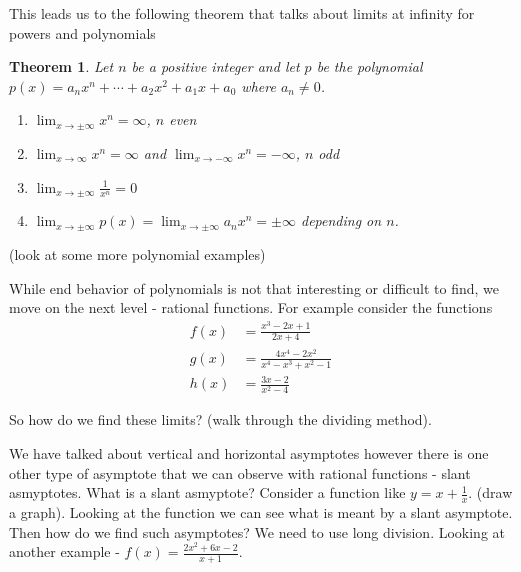 \documentclass[12pt,reqno]{article}
\newtheorem{Theorem}{Theorem}
\theoremstyle{definition}
\begin{document}
This leads us to the following theorem that talks about limits at infinity for powers and polynomials
\begin{Theorem}
	Let $n$ be a positive integer and let $p$ be the polynomial $p(x) = a_n x^n + \cdots + a_2 x^2 + a_1 x + a_0$ where $a_n \neq 0$. 
	\begin{enumerate}
		\item[a.] $\lim_{x\to\pm \infty} x^n = \infty$, $n$ even 
		\item[b.] $\lim_{x\to\infty} x^n = \infty$ and $\lim_{x\to-\infty} x^n = -\infty$, $n$ odd 
		\item[c.] $\lim_{x\to\pm \infty} \frac{1}{x^n} = 0$ 
		\item[d.] $\lim_{x \to \pm \infty} p(x) = \lim_{x \to \pm \infty} a_n x^n = \pm \infty$ depending on $n$. 
	\end{enumerate}
\end{Theorem}

(look at some more polynomial examples)

While end behavior of polynomials is not that interesting or difficult to find, we move on the next level - rational functions. For example consider the functions 
\begin{align*}
	f(x) &= \frac{x^3 - 2x + 1}{2x + 4} \\
	g(x) &= \frac{4 x^4 - 2x^2}{x^4 - x^3 + x^2 -1} \\
	h(x) &= \frac{3x - 2}{x^2 - 4}
\end{align*}

So how do we find these limits? (walk through the dividing method). 

We have talked about vertical and horizontal asymptotes however there is one other type of asymptote that we can observe with rational functions - slant asmyptotes. What is a slant asmyptote? Consider a function like $y = x + \frac{1}{x}$. (draw a graph). Looking at the function we can see what is meant by a slant asymptote. Then how do we find such asymptotes? We need to use long division. Looking at another example - $f(x) = \frac{2x^2 + 6x - 2}{x + 1}$. 
\end{document}
